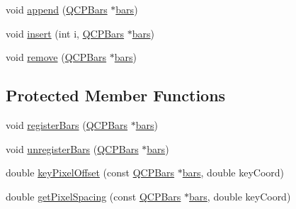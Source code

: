 \begin{DoxyCompactItemize}
\item 
void \mbox{\hyperlink{class_q_c_p_bars_group_a809ed63cc4ff7cd5b0b8c96b470163d3}{append}} (\mbox{\hyperlink{class_q_c_p_bars}{Q\+C\+P\+Bars}} $\ast$\mbox{\hyperlink{class_q_c_p_bars_group_a6e4f4e86abbec6a9342f204ef82abef8}{bars}})
\item 
void \mbox{\hyperlink{class_q_c_p_bars_group_a309a5f7233db189f3ea9c2d04ece6c13}{insert}} (int i, \mbox{\hyperlink{class_q_c_p_bars}{Q\+C\+P\+Bars}} $\ast$\mbox{\hyperlink{class_q_c_p_bars_group_a6e4f4e86abbec6a9342f204ef82abef8}{bars}})
\item 
void \mbox{\hyperlink{class_q_c_p_bars_group_a215e28a5944f1159013a0e19169220e7}{remove}} (\mbox{\hyperlink{class_q_c_p_bars}{Q\+C\+P\+Bars}} $\ast$\mbox{\hyperlink{class_q_c_p_bars_group_a6e4f4e86abbec6a9342f204ef82abef8}{bars}})
\end{DoxyCompactItemize}
\subsection*{Protected Member Functions}
\begin{DoxyCompactItemize}
\item 
void \mbox{\hyperlink{class_q_c_p_bars_group_a7b00514f19ad58d0bb3fd5246a67fae2}{register\+Bars}} (\mbox{\hyperlink{class_q_c_p_bars}{Q\+C\+P\+Bars}} $\ast$\mbox{\hyperlink{class_q_c_p_bars_group_a6e4f4e86abbec6a9342f204ef82abef8}{bars}})
\item 
void \mbox{\hyperlink{class_q_c_p_bars_group_ac7073cdd7b1a40c6cb4b5f908145f8c4}{unregister\+Bars}} (\mbox{\hyperlink{class_q_c_p_bars}{Q\+C\+P\+Bars}} $\ast$\mbox{\hyperlink{class_q_c_p_bars_group_a6e4f4e86abbec6a9342f204ef82abef8}{bars}})
\item 
double \mbox{\hyperlink{class_q_c_p_bars_group_a8e2ca6002e7bab49670144d048a2bcc9}{key\+Pixel\+Offset}} (const \mbox{\hyperlink{class_q_c_p_bars}{Q\+C\+P\+Bars}} $\ast$\mbox{\hyperlink{class_q_c_p_bars_group_a6e4f4e86abbec6a9342f204ef82abef8}{bars}}, double key\+Coord)
\item 
double \mbox{\hyperlink{class_q_c_p_bars_group_a0beccd41bc3841a4c5b284823bc7d2de}{get\+Pixel\+Spacing}} (const \mbox{\hyperlink{class_q_c_p_bars}{Q\+C\+P\+Bars}} $\ast$\mbox{\hyperlink{class_q_c_p_bars_group_a6e4f4e86abbec6a9342f204ef82abef8}{bars}}, double key\+Coord)
\end{DoxyCompactItemize}
